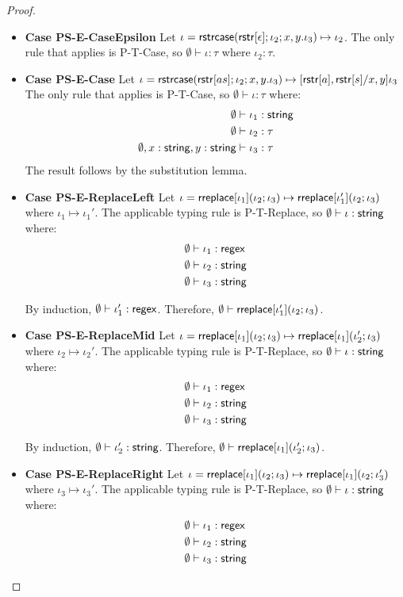 \documentclass[11pt,leqno]{article}
\theoremstyle{definition}
\newcommand{\str}{{\sf string}}
\newcommand{\regex}{{\sf regex}}
\newcommand{\strcase}[3]{ {\sf rstrcase}(#1; #2; #3)}
\begin{document}
\begin{proof}
\begin{itemize}[label=$ $,itemsep=1ex]
\item \textbf{Case PS-E-CaseEpsilon}
Let $\iota = \strcase{\rstr{\epsilon}}{\iota_2}{x,y.\iota_3} \mapsto \iota_2$.
The only rule that applies is P-T-Case, so $\emptyset \vdash \iota : \tau$ where
$\iota_2 : \tau$.

\item \textbf{Case PS-E-Case}
Let $\iota = \strcase{\rstr{as}}{\iota_2}{x,y.\iota_3} \mapsto [\rstr{a}, \rstr{s} / x,y] \iota_3$
The only rule that applies is P-T-Case, so $\emptyset \vdash \iota : \tau$ where:
\begin{align*}
  \emptyset &\vdash \iota_1 : \str \\
  \emptyset &\vdash \iota_2 : \tau \\
  \emptyset, x : \str, y : \str &\vdash \iota_3 : \tau
\end{align*}
The result follows by the substitution lemma.

\item \textbf{Case PS-E-ReplaceLeft}
Let $\iota = {\sf rreplace}[\iota_1](\iota_2;\iota_3) \mapsto {\sf rreplace}[\iota_1'](\iota_2;\iota_3)$
where $\iota_1 \mapsto \iota_1'$.
The applicable typing rule is P-T-Replace, so $\emptyset \vdash \iota : \str$ where:
\begin{align*}
  \emptyset &\vdash \iota_1 : \regex \\
  \emptyset &\vdash \iota_2 : \str \\
  \emptyset &\vdash \iota_3 : \str
\end{align*}

By induction, $\emptyset \vdash \iota_1' : \regex$.
Therefore, $\emptyset \vdash {\sf rreplace}[\iota_1'](\iota_2;\iota_3)$.

\item \textbf{Case PS-E-ReplaceMid}
Let $\iota = {\sf rreplace}[\iota_1](\iota_2;\iota_3) \mapsto {\sf rreplace}[\iota_1](\iota_2';\iota_3)$
where $\iota_2 \mapsto \iota_2'$.
The applicable typing rule is P-T-Replace, so $\emptyset \vdash \iota : \str$ where:
\begin{align*}
  \emptyset &\vdash \iota_1 : \regex \\
  \emptyset &\vdash \iota_2 : \str \\
  \emptyset &\vdash \iota_3 : \str
\end{align*}

By induction, $\emptyset \vdash \iota_2' : \str$.
Therefore, $\emptyset \vdash {\sf rreplace}[\iota_1](\iota_2';\iota_3)$.

\item \textbf{Case PS-E-ReplaceRight}
Let $\iota = {\sf rreplace}[\iota_1](\iota_2;\iota_3) \mapsto {\sf rreplace}[\iota_1](\iota_2;\iota_3')$
where $\iota_3 \mapsto \iota_3'$.
The applicable typing rule is P-T-Replace, so $\emptyset \vdash \iota : \str$ where:
\begin{align*}
  \emptyset &\vdash \iota_1 : \regex \\
  \emptyset &\vdash \iota_2 : \str \\
  \emptyset &\vdash \iota_3 : \str
\end{align*}


\end{itemize}
\end{proof}
\end{document}
